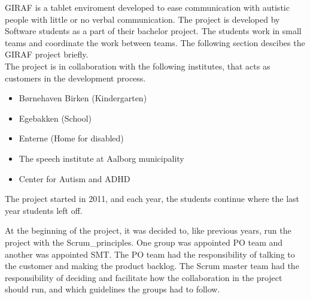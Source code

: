 GIRAF is a tablet enviroment developed to ease communication with autistic people with little or no verbal communication. The project is developed by Software students as a part of their bachelor project. The students work in small teams and coordinate the work between teams. The following section descibes the GIRAF project briefly. \\

The project is in collaboration with the following institutes\cite{GirafWebsite}, that acts as customers in the development process.

\begin{itemize}
    \item Børnehaven Birken (Kindergarten) \cite{bhBirken}
    \item Egebakken (School) \cite{egebakken}
    \item Enterne (Home for disabled) \cite{enterne}
    \item The speech institute at Aalborg municipality
    \item Center for Autism and ADHD \cite{center_for_autism}
\end{itemize}

The project started in 2011, and each year, the students continue where the last year students left off.

At the beginning of the project, it was decided to, like previous years, run the project with the \gls{Scrum_principles}. One group was appointed \gls{PO} team and another was appointed \gls{SMT}. The \gls{PO} team had the responsibility of talking to the customer and making the product backlog. The Scrum master team had the responsibility of deciding and facilitate how the collaboration in the project should run, and which guidelines the groups had to follow.